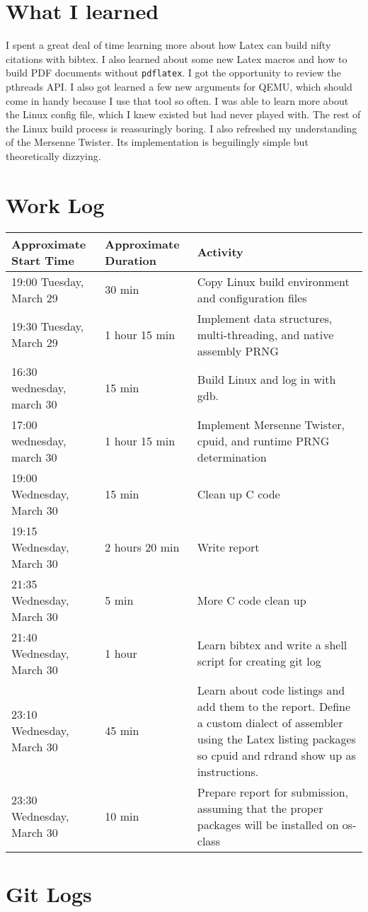 \documentclass[10pt,conference,draftclsnofoot,onecolumn]{IEEEtran}
\begin{document}
\section{What I learned}
I spent a great deal of time learning more about how Latex can build nifty citations with bibtex. I also learned about some new Latex macros and how to build PDF documents without \texttt{pdflatex}. I got the opportunity to review the pthreads API. I also got learned a few new arguments for QEMU, which should come in handy because I use that tool so often. I was able to learn more about the Linux config file, which I knew existed but had never played with. The rest of the Linux build process is reassuringly boring. I also refreshed my understanding of the Mersenne Twister. Its implementation is beguilingly simple but theoretically dizzying.


\section{Work Log}
\begin{tabular}{l l l}
    \textbf{Approximate Start Time} & \textbf{Approximate Duration} & \textbf{Activity} \\
    \hline
    19:00 Tuesday, March 29 & 30 min & Copy Linux build environment and configuration files \\
    19:30 Tuesday, March 29 & 1 hour 15 min & Implement data structures, multi-threading, and native assembly PRNG \\
    16:30 wednesday, march 30 & 15 min & Build Linux and log in with gdb. \\
    17:00 wednesday, march 30 & 1 hour 15 min & Implement Mersenne Twister, cpuid, and runtime PRNG determination \\
    19:00 Wednesday, March 30 & 15 min & Clean up C code \\
    19:15 Wednesday, March 30 & 2 hours 20 min & Write report \\
    21:35 Wednesday, March 30 & 5 min & More C code clean up \\
    21:40 Wednesday, March 30 & 1 hour & Learn bibtex and write a shell script for creating git log \\
    23:10 Wednesday, March 30 & 45 min & Learn about code listings and add them to the report. Define a custom dialect of assembler using the Latex listing packages so cpuid and rdrand show up as instructions. \\
    23:30 Wednesday, March 30 & 10 min & Prepare report for submission, assuming that the proper packages will be installed on os-class \\
\end{tabular}

\bigskip
\bigskip

\section{Git Logs}



\clearpage
\printbibliography
\end{document}
